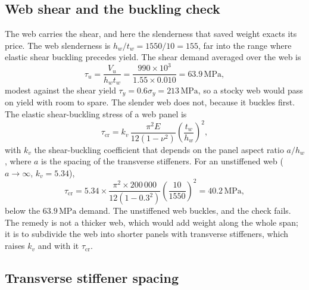\subsection{Web shear and the buckling check}

The web carries the shear, and here the slenderness that saved weight
exacts its price. The web slenderness is $h_w/t_w = 1550/10 = 155$, far
into the range where elastic shear buckling precedes yield. The shear
demand averaged over the web is
\[
\tau_u = \frac{V_u}{h_w t_w} = \frac{990 \times 10^3}{1.55 \times 0.010}
= 63.9\,\text{MPa},
\]
modest against the shear yield $\tau_y = 0.6\sigma_y = 213\,\text{MPa}$,
so a stocky web would pass on yield with room to spare. The slender web
does not, because it buckles first. The elastic shear-buckling stress of
a web panel is
\[
\tau_{\text{cr}} = k_v\,\frac{\pi^2 E}{12(1 - \nu^2)}
\left(\frac{t_w}{h_w}\right)^2,
\]
with $k_v$ the shear-buckling coefficient that depends on the panel
aspect ratio $a/h_w$, where $a$ is the spacing of the transverse
stiffeners. For an unstiffened web ($a \to \infty$, $k_v = 5.34$),
\[
\tau_{\text{cr}} = 5.34 \times \frac{\pi^2 \times 200\,000}
{12(1 - 0.3^2)}\left(\frac{10}{1550}\right)^2 = 40.2\,\text{MPa},
\]
below the $63.9\,\text{MPa}$ demand. The unstiffened web buckles, and
the check fails. The remedy is not a thicker web, which would add weight
along the whole span; it is to subdivide the web into shorter panels
with transverse stiffeners, which raises $k_v$ and with it
$\tau_{\text{cr}}$.

\subsection{Transverse stiffener spacing}

